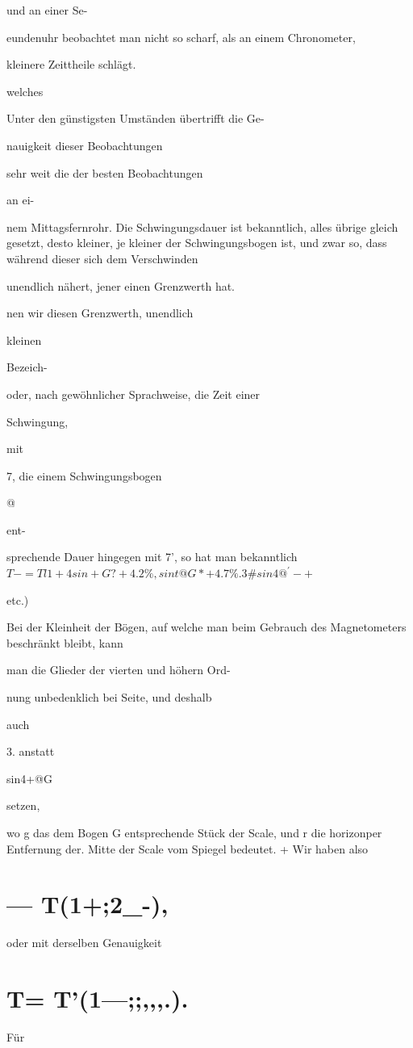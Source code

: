 \documentclass[12pt,a4paper]{article}
\begin{document}
und an einer Se-

eundenuhr beobachtet man nicht so scharf, als an einem Chronometer,

kleinere Zeittheile schlägt.

welches

Unter den günstigsten Umständen übertrifft die Ge-

nauigkeit dieser Beobachtungen

sehr weit die der besten Beobachtungen

an ei-

nem Mittagsfernrohr. Die Schwingungsdauer ist bekanntlich, alles übrige gleich gesetzt, desto kleiner, je kleiner der Schwingungsbogen ist, und zwar so, dass während dieser sich dem Verschwinden

unendlich nähert, jener einen Grenzwerth hat.

nen wir diesen Grenzwerth, unendlich

kleinen

Bezeich-

oder, nach gewöhnlicher Sprachweise, die Zeit einer

Schwingung,

mit

7, die einem Schwingungsbogen

@

ent-

sprechende Dauer hingegen mit 7’, so hat man bekanntlich $T -= Tl1+4sin+G?+4.2\%,sint@G*+4.7\% .3\#sin4 @^{\prime}-+$

etc.)

Bei der Kleinheit der Bögen, auf welche man beim Gebrauch des Magnetometers beschränkt bleibt, kann

man die Glieder der vierten und höhern Ord-

nung unbedenklich bei Seite, und deshalb

auch

3. anstatt

sin4+@G

setzen,

wo g das dem Bogen G entsprechende Stück der Scale, und r die horizonper Entfernung der. Mitte der Scale vom Spiegel bedeutet. + Wir haben also

\section*{— T(1+;2\_-),}
oder mit derselben Genauigkeit

\section*{T= T’(1—;;,,,.).}
Für
\end{document}
